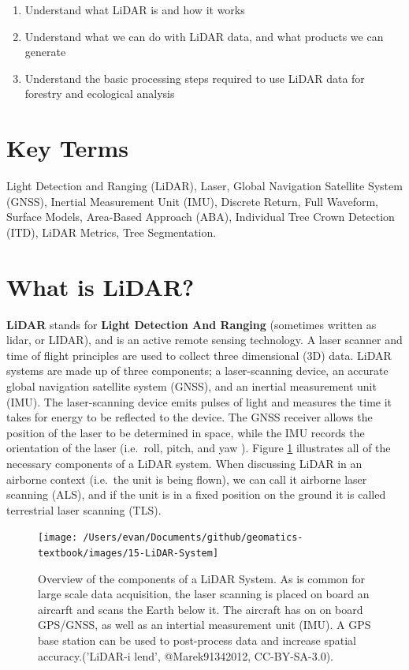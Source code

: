\documentclass[
]{book}
\providecommand{\tightlist}{%
  \setlength{\itemsep}{0pt}\setlength{\parskip}{0pt}}
\begin{document}
\begin{enumerate}
\def\labelenumi{\arabic{enumi}.}
\tightlist
\item
  Understand what LiDAR is and how it works
\item
  Understand what we can do with LiDAR data, and what products we can generate
\item
  Understand the basic processing steps required to use LiDAR data for forestry and ecological analysis
\end{enumerate}

\hypertarget{key-terms-13}{%
\section*{Key Terms}\label{key-terms-13}}

Light Detection and Ranging (LiDAR), Laser, Global Navigation Satellite System (GNSS), Inertial Measurement Unit (IMU), Discrete Return, Full Waveform, Surface Models, Area-Based Approach (ABA), Individual Tree Crown Detection (ITD), LiDAR Metrics, Tree Segmentation.

\hypertarget{what-is-lidar}{%
\section{What is LiDAR?}\label{what-is-lidar}}

\textbf{LiDAR} stands for \textbf{Light Detection And Ranging} (sometimes written as lidar, or LIDAR), and is an active remote sensing technology. A laser scanner and time of flight principles are used to collect three dimensional (3D) data. LiDAR systems are made up of three components; a laser-scanning device, an accurate global navigation satellite system (GNSS), and an inertial measurement unit (IMU). The laser-scanning device emits pulses of light and measures the time it takes for energy to be reflected to the device. The GNSS receiver allows the position of the laser to be determined in space, while the IMU records the orientation of the laser (i.e.~roll, pitch, and yaw \citep{White2013}). Figure \ref{fig:15-LiDAR-System} illustrates all of the necessary components of a LiDAR system. When discussing LiDAR in an airborne context (i.e.~the unit is being flown), we can call it airborne laser scanning (ALS), and if the unit is in a fixed position on the ground it is called terrestrial laser scanning (TLS).

\begin{figure}
\texttt{[image: /Users/evan/Documents/github/geomatics-textbook/images/15-LiDAR-System]} \caption{Overview of the components of a LiDAR System. As is common for large scale data acquisition, the laser scanning is placed on board an aircarft and scans the Earth below it. The aircraft has on on board GPS/GNSS, as well as an intertial measurement unit (IMU). A GPS base station can be used to post-process data and increase spatial accuracy.('LiDAR-i lend', @Marek91342012, CC-BY-SA-3.0).}\label{fig:15-LiDAR-System}
\end{figure}
\end{document}
